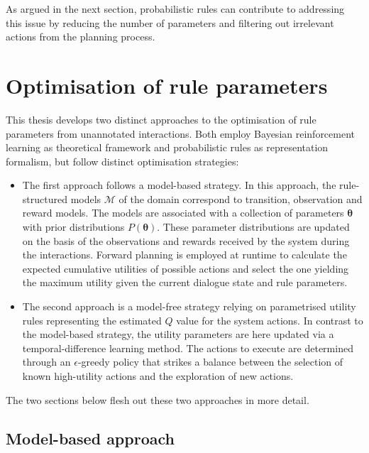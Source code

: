 As argued in the next section, probabilistic rules can contribute to addressing this issue by reducing the number of parameters and filtering out irrelevant actions from the planning process.

\section{Optimisation of rule parameters}
\label{sec:rl-ruleparams}

This thesis develops two distinct approaches to the optimisation of rule parameters from unannotated interactions. Both employ Bayesian reinforcement learning as theoretical framework and probabilistic rules as representation formalism, but follow distinct optimisation strategies:

\begin{itemize}
\item The first approach follows a model-based strategy.  In this approach, the rule-structured models $\mathcal{M}$ of the domain correspond to transition, observation and reward models. The models are associated with a collection of parameters $\boldsymbol\theta$ with prior distributions $P(\boldsymbol\theta)$.  These parameter distributions are updated on the basis of the observations and rewards received by the system during the interactions. Forward planning is employed at runtime to calculate the expected cumulative utilities of possible actions and select the one yielding the maximum utility given the current dialogue state and rule parameters. 

\item The second approach is a model-free strategy relying on parametrised utility rules representing the estimated $Q$ value for the system actions. In contrast to the model-based strategy, the utility parameters are here updated via a temporal-difference learning method.  The actions to execute are determined through an $\epsilon$-greedy policy that strikes a balance between the selection of known high-utility actions and the exploration of new actions.

\end{itemize}

The two sections below flesh out these two approaches in more detail. 

\subsection{Model-based approach}
\label{sec:modelbased}

